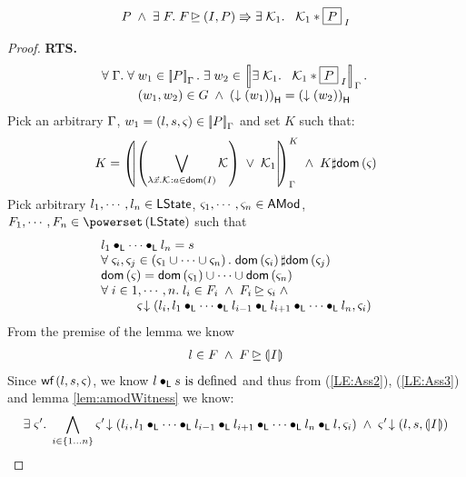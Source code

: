 \begin{lemma}[] \label{lem:extension}
%
\[
		P \;\land\; \exsts{\fence{}} \fence{} \strictfences (I, P)  \Rrightarrow \exsts{\capAss{1}} \;\; \capAss{1} * \shared{P}{I}
\]
%
\begin{proof}
\textbf{RTS. }
%
\[
\begin{array}{l}
	\for{\lenv} \for{w_1 \in \sem[\lenv]{P}} \exsts{w_2 \in \sem[\lenv]{\exsts{\capAss{1}} \;\; \capAss{1} * \shared{P }{I}}}\\
	\hspace*{1cm} (w_1, w_2) \in \guarantee \;\land\; \heapPart{\left(\collapseW{w_1}\right)} = \heapPart{\left(\collapseW{w_2}\right)}
\end{array}
\]
%
Pick an arbitrary $\lenv$, $w_1 = (l, s, \amod{}) \in \sem[\lenv]{P}$ and set $K$ such that:
\begin{align}
	K = 
	\semK[\lenv]{\left( \bigvee\limits_{\lambda \vec{x}. \capAss{}: a \in \dom{I}} \capAss{}\right) \;\lor\; \capAss{1} }
	\;\land\; K \disjoint \dom{\amod{}} \label{LE:Ass1}
\end{align}	 
%
Pick arbitrary $l_1, \cdots, l_n \in \LState$, $\amod{1} , \cdots, \amod{n} \in \AMods$, $F_1, \cdots, F_n \in \pset{\LState}$ such that 
%
\begin{align}
\begin{array}{l}
	l_1 \composeL \cdots \composeL l_n = s \\
	\for{\amod{i}, \amod{j} \in \left(\amod{1} \cup \cdots \cup \amod{n}\right)} \dom{\amod{i}} \disjoint \dom{\amod{j}}\\
	\dom{\amod{}} = \dom{\amod{1}} \cup \cdots \cup \dom{\amod{n}}\\
	\for{i \in 1, \cdots, n} l_i \in F_i \;\land\; F_i \strictfences \amod{i}\;\land\;\\
	\hspace*{1cm}\extendsAM{\amod{}}{l_i}{l_1 \composeL \cdots \composeL l_{i-1} \composeL l_{i+1} \composeL \cdots \composeL l_n}{\amod{i}} \label{LE:Ass2}
\end{array}
\end{align}
%
From the premise of the lemma we know 
%
\begin{align}
	l \in F \;\land\; F \strictfences \intermediateSemI{I} \label{LE:Ass3}
\end{align}
Since $\wf{l, s, \amod{}}$, we know $l \composeL s \text{ is defined}$ and thus from (\ref{LE:Ass2}), (\ref{LE:Ass3}) and lemma \ref{lem:amodWitness} we know:
%
\begin{align}
	\exsts{\amod{}'} \bigwedge\limits_{i \in \{1...n\}} \extendsAM{\amod{}'}{l_i}{l_1\composeL \cdots \composeL l_{i-1} \composeL l_{i+1}\composeL \cdots \composeL l_{n} \composeL l}{\amod{i}} \;\land\; \extendsAM{\amod{}'}{l}{s}{\intermediateSemI{I}} \label{LE:Ass4}

\end{align}
\end{proof}
\end{lemma}

